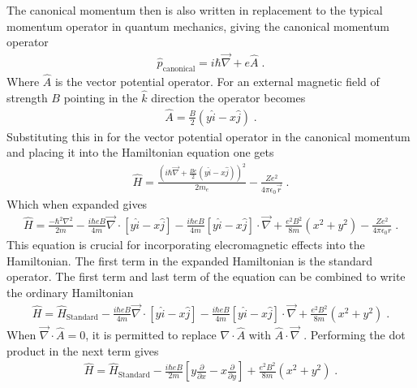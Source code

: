         The canonical momentum then is also written in replacement to the typical momentum operator in quantum mechanics, giving the canonical momentum operator 
        \begin{align}
            \hat{p}_{\text{canonical}} = i \hbar \vec{\nabla} + e \hat{A} \;.
        \end{align}
        \noindent Where $\hat{A}$ is the vector potential operator. For an external magnetic field of strength $B$ pointing in the $\hat{k}$ direction the operator becomes 
        \begin{align}
            \hat{A} = \frac{B}{2} \left(y \hat{i} - x \hat{j} \right)\;.
        \end{align}
        \noindent Substituting this in for the vector potential operator in the canonical momentum and placing it into the Hamiltonian equation one gets 
        \begin{align}
            \hat{H} = \frac{\left(i\hbar \vec{\nabla} + \frac{Be}{2}\left(y \hat{i} - x \hat{j} \right)\right)^2}{2m_e} - \frac{Ze^2}{4 \pi \epsilon_0 \vec{r}}\;.
        \end{align}
        \noindent Which when expanded gives
        \small
        \begin{align}
            \hat{H} = \frac{-\hbar^2 \nabla^2}{2m} - \frac{i\hbar e B}{4m} \vec{\nabla} \cdot \left[y\hat{i} - x\hat{j} \right] - \frac{i\hbar e B}{4m} \left[y\hat{i} - x\hat{j} \right] \cdot \vec{\nabla} + \frac{e^2B^2}{8m} \left(x^2 + y^2\right) - \frac{Ze^2}{4\pi \epsilon_0 r}\;.
        \end{align}
        \normalsize
        \noindent This equation is crucial for incorporating elecromagnetic effects into the Hamiltonian. The first term in the expanded Hamiltonian is the standard operator. The first term and last term of the equation can be combined to write the ordinary Hamiltonian 
        \begin{align}
            \hat{H} =  \hat{H}_{\text{Standard}} - \frac{i\hbar e B}{4m} \vec{\nabla} \cdot \left[y\hat{i} - x\hat{j} \right] - \frac{i\hbar e B}{4m} \left[y\hat{i} - x\hat{j} \right] \cdot \vec{\nabla} + \frac{e^2B^2}{8m} \left(x^2 + y^2\right)\;.
        \end{align}
        \noindent When $\vec{\nabla} \cdot \hat{A} = 0$, it is permitted to replace $\nabla \cdot \hat{A}$ with $\hat{A} \cdot \vec{\nabla}$ \cite{Sakurai_Napolitano_2020}. Performing the dot product in the next term gives 
        \begin{align}
            \hat{H} =  \hat{H}_{\text{Standard}} - \frac{i\hbar e B}{2m} \left[y \frac{\partial}{\partial x} - x \frac{\partial}{\partial y} \right]+ \frac{e^2B^2}{8m} \left(x^2 + y^2\right)\;.
        \end{align}
